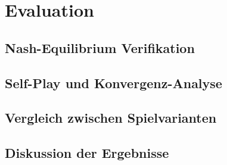 \chapter{Evaluation}

\section{Nash-Equilibrium Verifikation}

\section{Self-Play und Konvergenz-Analyse}

\section{Vergleich zwischen Spielvarianten}

\section{Diskussion der Ergebnisse}
